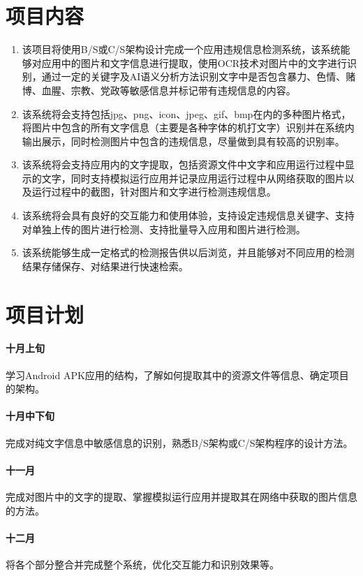 \documentclass[UTF8]{ctexart}
\begin{document}
	\section{项目内容}
		\begin{enumerate}
			\item 该项目将使用B/S或C/S架构设计完成一个应用违规信息检测系统，该系统能够对应用中的图片和文字信息进行提取，使用OCR技术对图片中的文字进行识别，通过一定的关键字及AI语义分析方法识别文字中是否包含暴力、色情、赌博、血腥、宗教、党政等敏感信息并标记带有违规信息的内容。
			\item 该系统将会支持包括jpg、png、icon、jpeg、gif、bmp在内的多种图片格式，将图片中包含的所有文字信息（主要是各种字体的机打文字）识别并在系统内输出展示，同时检测图片中包含的违规信息，尽量做到具有较高的识别率。
			\item 该系统将会支持应用内的文字提取，包括资源文件中文字和应用运行过程中显示的文字，同时支持模拟运行应用并记录应用运行过程中从网络获取的图片以及运行过程中的截图，针对图片和文字进行检测违规信息。
			\item 该系统将会具有良好的交互能力和使用体验，支持设定违规信息关键字、支持对单独上传的图片进行检测、支持批量导入应用和图片进行检测。
			\item 该系统能够生成一定格式的检测报告供以后浏览，并且能够对不同应用的检测结果存储保存、对结果进行快速检索。
		\end{enumerate}

	\section{项目计划}
		\paragraph{十月上旬}
		学习Android APK应用的结构，了解如何提取其中的资源文件等信息、确定项目的架构。
		\paragraph{十月中下旬}
		完成对纯文字信息中敏感信息的识别，熟悉B/S架构或C/S架构程序的设计方法。
		\paragraph{十一月}
		完成对图片中的文字的提取、掌握模拟运行应用并提取其在网络中获取的图片信息的方法。
		\paragraph{十二月}
		将各个部分整合并完成整个系统，优化交互能力和识别效果等。
\end{document}
